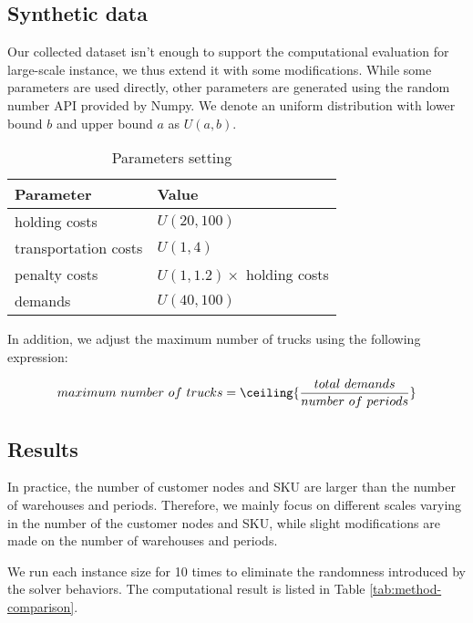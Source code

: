 \documentclass[a4paper,12pt]{article}
\begin{document}
\subsection{Synthetic data}

Our collected dataset isn't enough to support the computational evaluation for large-scale instance, we thus extend it with some modifications.
While some parameters are used directly, other parameters are generated using the random number API provided by Numpy.
We denote an uniform distribution with lower bound $b$ and upper bound $a$ as $U(a, b)$.

\begin{table}[htbp]
    \centering
    \caption{Parameters setting}
    \label{tab:example}
    \begin{tabular}{ll}
        \toprule
        Parameter & Value \\
        \midrule
        holding costs   & $U(20, 100)$  \\
        transportation costs   & $U(1, 4)$  \\
        penalty costs   & $U(1, 1.2) \times$ holding costs  \\
        demands         & $U(40, 100)$ \\
        \bottomrule
    \end{tabular}
\end{table}

In addition, we adjust the maximum number of trucks using the following expression:

$$
maximum \ number \ of \ trucks = \ceiling{\frac{total \ demands}{number \ of \  periods}}
$$

\subsection{Results}

In practice, the number of customer nodes and SKU are larger than the number of warehouses and periods. Therefore, we mainly focus on different scales varying in the number of the customer nodes and SKU, while slight modifications are made on the number of warehouses and periods.

We run each instance size for 10 times to eliminate the randomness introduced by the solver behaviors. The computational result is listed in Table \ref{tab:method-comparison}.
\end{document}

